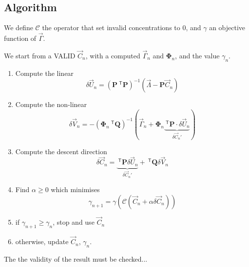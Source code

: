 \documentclass[aps]{revtex4}
\newcommand{\mymat}[1]{\bm{#1}}
\newcommand{\mytrn}[1]{~^{\mathsf{T}}{#1}}
\begin{document}
\subsection{Algorithm}
We define $\mathcal{C}$ the operator that set invalid concentrations to $0$, and $\gamma$ an
objective function of $\vec{\Gamma}$.

We start from a VALID $\vec{C}_n$, with a computed $\vec{\Gamma}_n$ and $\mymat{\Phi}_n$, and
the value $\gamma_n$.

\begin{enumerate}
\item Compute the linear 
	$$\delta\vec{U}_n = \left(\mymat{P}\mytrn{\mymat{P}}\right)^{-1} \left( \vec{\Lambda} - \mymat{P} \vec{C}_n \right)$$

\item Compute the non-linear
	$$\delta\vec{V}_n = - \left(\mymat{\Phi}_n\mytrn{\mymat{Q}}\right)^{-1}\left(\vec{\Gamma}_n+\mymat{\Phi}_n\underbrace{\mytrn{\mymat{P}}\cdot\delta\vec{U}_n}_{\delta\vec{C}_n'}\right)$$

\item Compute the descent direction 
$$
	\delta\vec{C}_n = \underbrace{\mytrn{\mymat{P}} \delta \vec{U}_n}_{\delta\vec{C}_n'} + \mytrn{\mymat{Q}} \delta\vec{V}_n
$$

\item Find $\alpha\geq0$ which minimises 
$$
	\gamma_{n+1} = \gamma\left( \mathcal{C}\left(\vec{C}_n + \alpha \delta\vec{C}_n\right)\right)
$$

\item if $\gamma_{n+1}\geq\gamma_n$, stop and use $\vec{C}_n$ 
\item otherwise, update $\vec{C}_n$, $\gamma_n$.
\end{enumerate}

The the validity of the result must be checked...
\end{document}
